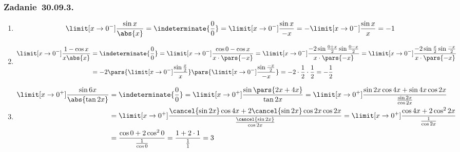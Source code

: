 \subsubsection*{Zadanie~30.09.3.}
\begin{enumerate}[label={\alph*)}]
    \item
        \begin{equation*}
            \limit[x \to 0^-] \frac{\sin x}{\abs{x}}
                = \indeterminate{\frac{0}{0}}
                = \limit[x \to 0^-] \frac{\sin x}{-x}
                = -\limit[x \to 0^-] \frac{\sin x}{x}
                = -1
        \end{equation*}
    \item
        \begin{equation*}
            \begin{split}
                \limit[x \to 0^-] \frac{1 - \cos x}{x\abs{x}}
                    &= \indeterminate{\frac{0}{0}}
                    = \limit[x \to 0^-] \frac{\cos 0 - \cos{x}}{x \cdot \pars{-x}}
                    = \limit[x \to 0^-] \frac{-2\sin\frac{0 + x}{2}\sin\frac{0 - x}{2}}{x \cdot \pars{-x}}
                    = \limit[x \to 0^-] \frac{-2\sin\frac{x}{2}\sin\frac{-x}{2}}{x \cdot \pars{-x}}\\
                    &= -2\pars{\limit[x \to 0^-] \frac{\sin\frac{x}{2}}{x}}\pars{\limit[x \to 0^-] \frac{\sin\frac{-x}{2}}{-x}}
                    = -2 \cdot \frac{1}{2} \cdot \frac{1}{2}
                    = -\frac{1}{2}
            \end{split}
        \end{equation*}
    \item
        \begin{equation*}
            \begin{split}
                \limit[x \to 0^+] \frac{\sin 6x}{\abs{\tan 2x}}
                    &= \indeterminate{\frac{0}{0}}
                    = \limit[x \to 0^+] \frac{\sin\pars{2x + 4x}}{\tan{2x}}
                    = \limit[x \to 0^+] \frac{\sin 2x \cos 4x + \sin 4x \cos 2x}{\frac{\sin 2x}{\cos 2x}}\\
                    &= \limit[x \to 0^+] \frac{\cancel{\sin 2x} \cos 4x + 2 \cancel{\sin 2x} \cos 2x \cos 2x}{\frac{\cancel{\sin 2x}}{\cos 2x}}
                    = \limit[x \to 0^+] \frac{\cos 4x + 2 \cos^2 2x}{\frac{1}{\cos 2x}}\\
                    &= \frac{\cos 0 + 2 \cos^2 0}{\frac{1}{\cos 0}}
                    = \frac{1 + 2 \cdot 1}{\frac{1}{1}}
                    = 3
            \end{split}

\end{equation*}
\end{enumerate}
